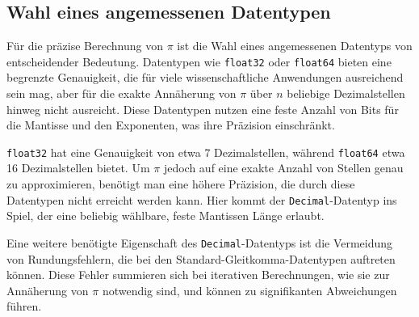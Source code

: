 \documentclass{scrartcl}
\theoremstyle{definition}
\newtheorem{approximation sequence}{Annäherungsfolge}
\begin{document}
%

\subsection{Wahl eines angemessenen Datentypen}

Für die präzise Berechnung von \(\pi\) ist die Wahl eines angemessenen
Datentyps von entscheidender Bedeutung. Datentypen wie \texttt{float32} oder
\texttt{float64} bieten eine begrenzte Genauigkeit, die für viele
wissenschaftliche Anwendungen ausreichend sein mag, aber für die exakte
Annäherung von \(\pi\) über \(n\) beliebige Dezimalstellen hinweg nicht
ausreicht.
Diese Datentypen nutzen eine feste Anzahl von Bits für die Mantisse und den
Exponenten, was ihre Präzision einschränkt.

\texttt{float32} hat eine Genauigkeit von etwa 7 Dezimalstellen, während
\texttt{float64} etwa 16 Dezimalstellen bietet.
Um \(\pi\) jedoch auf eine exakte Anzahl von Stellen genau zu approximieren,
benötigt man eine höhere Präzision, die durch diese Datentypen nicht erreicht
werden kann.
Hier kommt der \texttt{Decimal}-Datentyp ins Spiel, der eine beliebig wählbare,
feste Mantissen Länge erlaubt.

Eine weitere benötigte Eigenschaft des \texttt{Decimal}-Datentyps ist die
Vermeidung von Rundungsfehlern, die bei den Standard-Gleitkomma-Datentypen
auftreten können. Diese Fehler summieren sich bei iterativen Berechnungen, wie
sie zur Annäherung von \(\pi\) notwendig sind, und können zu signifikanten
Abweichungen führen.
\end{document}
